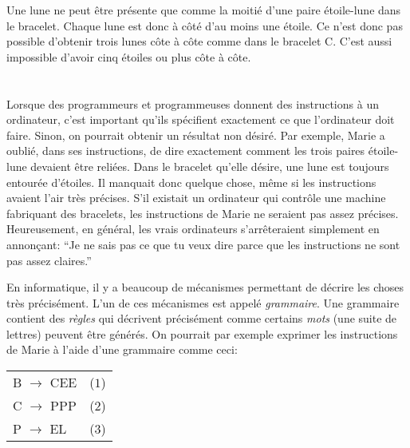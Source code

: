 {{Une lune ne peut être présente que comme la moitié d’une paire étoile-lune dans le bracelet. Chaque lune est donc à côté d’au moins une étoile. Ce n’est donc pas possible d’obtenir trois lunes côte à côte comme dans le bracelet C. C’est aussi impossible d’avoir cinq étoiles ou plus côte à côte.

{\centering%
\par}



\section*{\BrochureItsInformatics}
Lorsque des programmeurs et programmeuses donnent des instructions à un ordinateur, c’est important qu’ils spécifient exactement ce que l’ordinateur doit faire. Sinon, on pourrait obtenir un résultat non désiré. Par exemple, Marie a oublié, dans ses instructions, de dire exactement comment les trois paires étoile-lune devaient être reliées. Dans le bracelet qu’elle désire, une lune est toujours entourée d’étoiles. Il manquait donc quelque chose, même si les instructions avaient l’air très précises. S’il existait un ordinateur qui contrôle une machine fabriquant des bracelets, les instructions de Marie ne seraient pas assez précises. Heureusement, en général, les vrais ordinateurs s’arrêteraient simplement en annonçant: “Je ne sais pas ce que tu veux dire parce que les instructions ne sont pas assez claires.”

En informatique, il y a beaucoup de mécanismes permettant de décrire les choses très précisément. L’un de ces mécanismes est appelé \emph{grammaire}. Une grammaire contient des \emph{règles} qui décrivent précisément comme certains \emph{mots} (une suite de lettres) peuvent être générés. On pourrait par exemple exprimer les instructions de Marie à l’aide d’une grammaire comme ceci:

\begin{adjustwidth}{1.5em}{0em}
\begin{tabular}{ @{} l l @{} }
  B \ensuremath{\rightarrow} CEE & ($1$) \\ 
  C \ensuremath{\rightarrow} PPP & ($2$) \\ 
  P \ensuremath{\rightarrow} EL & ($3$)
\end{tabular}


\end{adjustwidth}

}}
